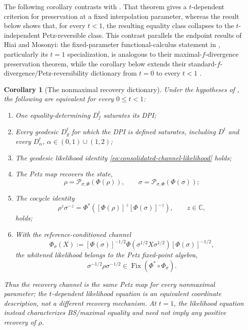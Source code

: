 \documentclass[11pt]{article}
\newtheorem{corollary}[corollary]{Corollary}
\theoremstyle{remark}
\newcommand{\1}{\mathbbm{1}}
\begin{document}
The following corollary contrasts with
.  That theorem gives a
$t$-dependent criterion for preservation at a fixed interpolation
parameter, whereas the result below shows that, for every $t<1$, the
resulting equality class collapses to the $t$-independent
Petz-reversible class.  This contrast parallels the endpoint results
of Hiai and Mosonyi: the fixed-parameter functional-calculus statement
in , particularly its $t=1$
specialization, is analogous to their maximal-$f$-divergence
preservation theorem, while the corollary below extends their
standard-$f$-divergence/Petz-reversibility dictionary from $t=0$ to
every $t<1$ \cite[Theorems~3.34 and~3.18]{hiai2017different}.

\begin{corollary}[The nonmaximal recovery dictionary]
\label{cor:consolidated-interior-recovery-dictionary}
Under the hypotheses of
, the following are
equivalent for every $0\leq t<1$:
\begin{enumerate}
\item One equality-determining $D_f^t$ saturates its DPI;
\item Every geodesic $D_g^t$ for which the DPI is defined
saturates, including $D^t$ and every
$D_\alpha^t$, $\alpha\in(0,1)\cup(1,2)$;
\item The geodesic likelihood identity
\eqref{eq:consolidated-channel-likelihood} holds;
\item The Petz map recovers the state,
\begin{equation}
 \rho=\mathcal P_{\sigma,\Phi}(\Phi(\rho)),
 \qquad
 \sigma=\mathcal P_{\sigma,\Phi}(\Phi(\sigma));
\end{equation}
\item The cocycle identity
\begin{equation}
 \rho^z\sigma^{-z}
 =\Phi^*([\Phi(\rho)]^{\,z}[\Phi(\sigma)]^{-z}),
 \qquad z\in\mathbb C,
\end{equation}
holds;
\item With the reference-conditioned channel
\begin{equation}
 \Phi_\sigma(X):=[\Phi(\sigma)]^{-1/2}
 \Phi(\sigma^{1/2}X\sigma^{1/2})[\Phi(\sigma)]^{-1/2},
 \label{eq:consolidated-conditioned-channel}
\end{equation}
the whitened likelihood belongs to the Petz fixed-point algebra,
\begin{equation}
 \sigma^{-1/2}\rho\sigma^{-1/2}
 \in\operatorname{Fix}(\Phi^*\circ\Phi_\sigma).
\end{equation}
\end{enumerate}
Thus the recovery channel is the same Petz map for every nonmaximal
parameter; the $t$-dependent likelihood equation is an equivalent
coordinate description, not a different recovery mechanism.  At
$t=1$, the likelihood equation instead characterizes BS/maximal
equality and need not imply any positive recovery of $\rho$.
\end{corollary}
\end{document}
